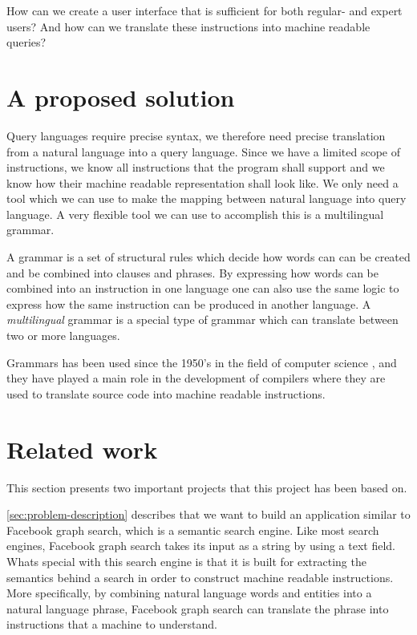 How can we create a user interface that is sufficient for both regular- and expert users? And how can we translate these instructions into machine readable queries?

\section{A proposed solution}
Query languages require precise syntax, we therefore need precise translation from a natural language into a query language. Since we have a limited scope of instructions, we know all instructions that the program shall support and we know how their machine readable representation shall look like. We only need a tool which we can use to make the mapping between natural language into query language. A very flexible tool we can use to accomplish this is a multilingual grammar. 

A grammar is a set of structural rules which decide how words can can be created and be combined into clauses and phrases. By expressing how words can be combined into an instruction in one language one can also use the same logic to express how the same instruction can be produced in another language. A \emph{multilingual} grammar is a special type of grammar which can translate between two or more languages.

Grammars has been used since the 1950's in the field of computer science \cite[p. 4]{ranta:2011}, and they have played a main role in the development of compilers where they are used to translate source code into machine readable instructions.

\section{Related work}
This section presents two important projects that this project has been based on.

\autoref{sec:problem-description} describes that we want to build an application similar to Facebook graph search, which is a semantic search engine. Like most search engines, Facebook graph search takes its input as a string by using a text field. Whats special with this search engine is that it is built for extracting the semantics behind a search in order to construct machine readable instructions. More specifically, by combining natural language words and entities into a natural language phrase, Facebook graph search can translate the phrase into instructions that a machine to understand.


